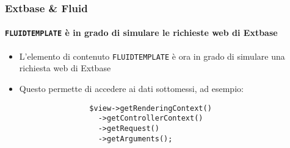 \begin{frame}[fragile]
	\frametitle{Extbase \& Fluid}
	\framesubtitle{\texttt{FLUIDTEMPLATE} è in grado di simulare le richieste web di Extbase}

	\lstset{basicstyle=\small\ttfamily}

	\begin{itemize}
		\item L'elemento di contenuto \texttt{FLUIDTEMPLATE} è ora in grado di simulare una richiesta web di Extbase
		\item Questo permette di accedere ai dati sottomessi, ad esempio:

			\begin{lstlisting}
				$view->getRenderingContext()
				  ->getControllerContext()
				  ->getRequest()
				  ->getArguments();
			\end{lstlisting}

	\end{itemize}

\end{frame}




